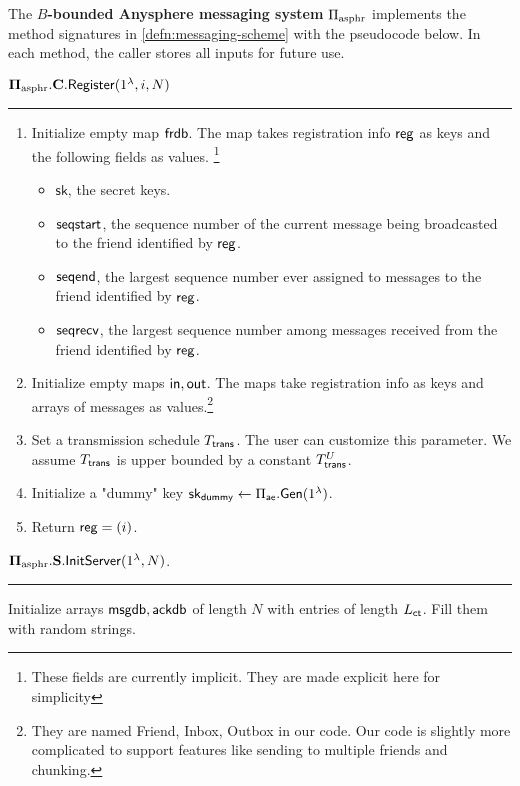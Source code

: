 \begin{definition}
\label{defn:asphr-code}
The \textbf{$B$-bounded Anysphere messaging system} $\Pi_{\text{asphr}}$ implements the method signatures in \cref{defn:messaging-scheme} with the pseudocode below. In each method, the caller stores all inputs for future use.
\vspace{10pt}

$\mathbf{\Pi_{\text{asphr}}.C.\mathsf{Register}}(1^{\lambda}, i, N)$
\vspace{5pt}
\hrule
\vspace{5pt}
\begin{enumerate}
    \item Initialize empty map $\mathsf{frdb}$. The map takes registration info $\mathsf{reg}$ as keys and the following fields as values.    \footnote{These fields are currently implicit. They are made explicit here for simplicity}
    \begin{itemize}
        \item $\mathsf{sk}$, the secret keys.
        \item $\mathsf{seqstart}$, the sequence number of the current message being broadcasted to the friend identified by $\mathsf{reg}$.
        \item $\mathsf{seqend}$, the largest sequence number ever assigned to messages to the friend identified by $\mathsf{reg}$.
        \item $\mathsf{seqrecv}$, the largest sequence number among messages received from the friend identified by $\mathsf{reg}$.
    \end{itemize}

    \item Initialize empty maps $\mathsf{in}, \mathsf{out}$. The maps take registration info as keys and arrays of messages as values.\footnote{They are named Friend, Inbox, Outbox in our code. Our code is slightly more complicated to support features like sending to multiple friends and chunking.}
    \item Set a transmission schedule $T_{\mathsf{trans}}$. The user can customize this parameter. We assume $T_{\mathsf{trans}}$ is upper bounded by a constant $T_{\mathsf{trans}}^U$.
    \item Initialize a "dummy" key ${\mathsf{sk}}_{\mathsf{dummy}} \leftarrow \Pi_{\mathsf{ae}}.\mathsf{Gen}(1^{\lambda})$.
    \item Return $\mathsf{reg} = (i)$.
\end{enumerate}
\vspace{10pt}
$\mathbf{\Pi_{\text{asphr}}.S.\mathsf{InitServer}}(1^{\lambda}, N)$.
\vspace{5pt}
\hrule
\vspace{5pt}
Initialize arrays $\mathsf{msgdb}, \mathsf{ackdb}$ of length $N$ with entries of length $L_{\mathsf{ct}}$. Fill them with random strings.


\end{definition}
